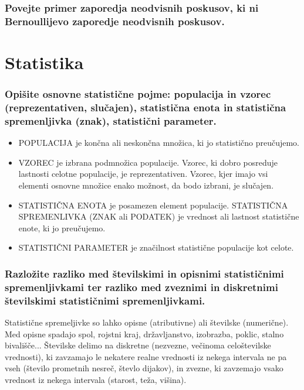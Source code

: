 \documentclass{article}
\begin{document}
\subsubsection*{Povejte primer zaporedja neodvisnih poskusov, ki ni Bernoullijevo zaporedje neodvisnih poskusov.}



\section{Statistika}
\subsubsection*{Opišite osnovne statistične pojme: populacija in vzorec (reprezentativen, slučajen), statistična enota in statistična spremenljivka (znak), statistični parameter.}

\begin{itemize}
  \item POPULACIJA je končna ali neskončna množica, ki jo statistično preučujemo.


\item VZOREC je izbrana podmnožica populacije. Vzorec, ki dobro posreduje lastnosti celotne populacije, je reprezentativen. Vzorec, kjer imajo vsi elementi osnovne množice enako možnost, da bodo izbrani, je slučajen.


  \item STATISTIČNA ENOTA je posamezen element populacije. STATISTIČNA SPREMENLIVKA (ZNAK ali PODATEK) je vrednost ali lastnost statistične enote, ki jo preučujemo.

  \item STATISTIČNI PARAMETER je značilnost statistične populacije kot celote.

\end{itemize}

\subsubsection*{Razložite razliko med številskimi in opisnimi statističnimi spremenljivkami ter razliko med zveznimi in diskretnimi številskimi statističnimi spremenljivkami.}

Statistične spremeljivke so lahko opisne (atributivne) ali številske (numerične). Med opisne spadajo spol, rojstni kraj, državljanstvo, izobrazba, poklic, stalno bivališče... Številske delimo na diskretne (nezvezne, večinoma celoštevilske vrednosti), ki zavzamajo le nekatere realne vrednosti iz nekega intervala ne pa vseh (število prometnih nesreč, števlo dijakov), in zvezne, ki zavzemajo vsako vrednost iz nekega intervala (starost, teža, višina).
\end{document}
